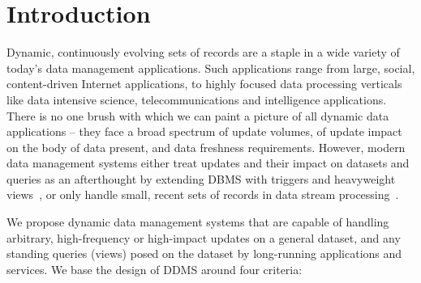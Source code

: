 





\section{Introduction}

Dynamic, continuously evolving sets of records are a staple in a wide variety of
today's data management applications. Such applications range from large,
social, content-driven Internet applications, to highly focused data processing
verticals like data intensive science, telecommunications and intelligence
applications. There is no one brush with which we can paint a picture of all
dynamic data applications -- they face a broad spectrum of update volumes, of
update impact on the body of data present, and data freshness requirements.
However, modern data management systems either treat updates and their impact on
datasets and queries as an afterthought by extending DBMS with triggers and
heavyweight views~\cite{griffin-sigmod:95, bello-vldb:98, zhou-vldb:07,
zhou-icde:07}, or only handle small, recent sets of records in data stream
processing~\cite{abadi-vldbj:03, demers-sigmod:07, motwani-cidr:03,
chandrasekaran-cidr:03}.






We propose dynamic data management systems that are capable of handling
arbitrary, high-frequency or high-impact updates on a general dataset,
and any standing queries (views) posed on the dataset by long-running
applications and services. We base the design of DDMS around four criteria:

